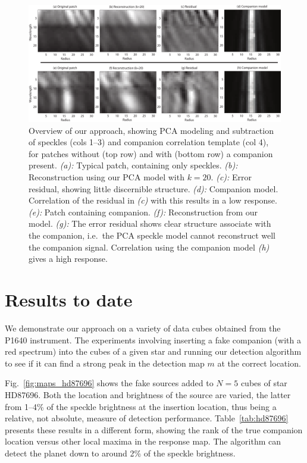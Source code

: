 \documentclass[12pt,pdftex,preprint]{aastex}
\newcommand{\fig}[1]{Fig.\ \ref{fig:#1}}
\newcommand{\tab}[1]{Table~\ref{tab:#1}}
\begin{document}
\begin{figure}[h!]
\begin{center}
\includegraphics[width=6.5in]{figs/patch_reconstructions.pdf}
\end{center}
\vspace{-7mm}
\caption{Overview of our approach, showing PCA modeling and
  subtraction of speckles (cols 1--3) and companion correlation
  template (col 4), for patches without (top row) and with (bottom
  row) a companion present. {\em (a):} Typical
 patch, containing only speckles. {\em (b):} Reconstruction
 using our PCA model with $k=20$. {\em (c):} Error
 residual, showing little discernible structure. {\em (d):}
 Companion model. Correlation of the residual in {\em (c)} with this
 results in a low response.  {\em (e):} Patch
 containing companion. {\em (f):} Reconstruction from our
 model. {\em (g):} The error residual shows clear structure
 associate with the companion, i.e.~the PCA speckle model cannot
 reconstruct well the companion signal. Correlation using the
 companion model {\em (h)} gives a high response.}
\label{fig:patch_recon}
\end{figure}

\section{Results to date}
We demonstrate our approach on a variety of data cubes obtained from
the P1640 instrument. The experiments involving inserting a fake
companion (with a red spectrum) into the cubes of a given star and running our detection
algorithm to see if it can find a strong peak in the detection map $m$
at the correct location.

\fig{maps_hd87696} shows the fake sources added to $N=5$ cubes of star
HD87696. Both the location and brightness of the source are varied,
the latter from 1--4\% of the speckle brightness at the insertion
location, thus being a relative, not absolute, measure of detection
performance. \tab{hd87696} presents these results in a different form,
showing the rank of the true companion location versus other local
maxima in the response map. The algorithm can detect the planet down to
around 2\% of the speckle brightness.
\end{document}
